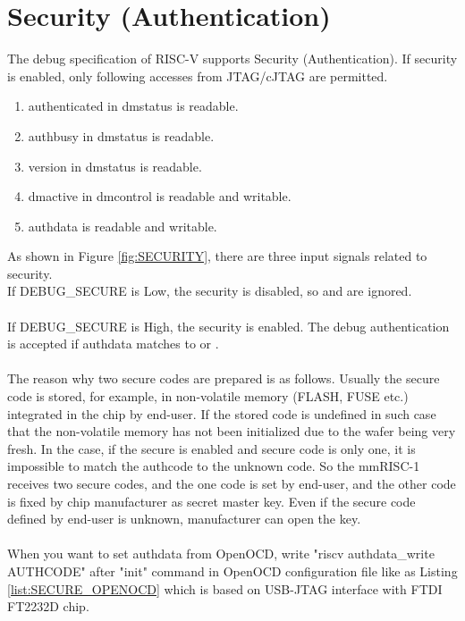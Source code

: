 \section{Security (Authentication)}
\label{sec:SECURITY}

The debug specification of RISC-V supports Security (Authentication). If security is enabled, only following accesses from JTAG/cJTAG are permitted.

\begin{enumerate}
    \item authenticated in dmstatus is readable.
    \item authbusy in dmstatus is readable.
    \item version in dmstatus is readable.
    \item dmactive in dmcontrol is readable and writable. 
    \item authdata is readable and writable.
\end{enumerate}

As shown in Figure \ref{fig:SECURITY}, there are three input signals related to security.\\
If DEBUG\_SECURE is Low, the security is disabled, so  and  are ignored.\\\\
If DEBUG\_SECURE is High, the security is enabled. The debug authentication is accepted if authdata matches to   or .\\\\
The reason why two secure codes are prepared is as follows. Usually the secure code is stored, for example, in non-volatile memory (FLASH, FUSE etc.) integrated in the chip by end-user. If the stored code is undefined in such case that the non-volatile memory has not been initialized due to the wafer being very fresh. In the case, if the secure is enabled and secure code is only one, it is impossible to match the authcode to the unknown code. So the mmRISC-1 receives two secure codes, and the one code is set by end-user, and the other code is fixed by chip manufacturer as secret master key. Even if the secure code defined by end-user is unknown, manufacturer can open the key.\\\\
When you want to set authdata from OpenOCD, write "riscv authdata\_write AUTHCODE" after "init" command in OpenOCD configuration file like as Listing \ref{list:SECURE_OPENOCD} which is based on USB-JTAG interface with FTDI FT2232D chip.


